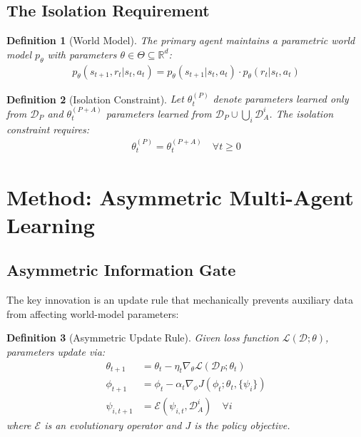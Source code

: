 \documentclass[12pt, a4paper]{article}
\newtheorem{definition}{Definition}
\begin{document}
\subsection{The Isolation Requirement}

\begin{definition}[World Model]
The primary agent maintains a parametric world model $p_\theta$ with parameters $\theta \in \Theta \subseteq \mathbb{R}^d$:
\begin{align}
p_\theta(s_{t+1}, r_t | s_t, a_t) = p_\theta(s_{t+1} | s_t, a_t) \cdot p_\theta(r_t | s_t, a_t)
\end{align}
\end{definition}

\begin{definition}[Isolation Constraint]
Let $\theta_t^{(P)}$ denote parameters learned only from $\mathcal{D}_P$ and $\theta_t^{(P+A)}$ parameters learned from $\mathcal{D}_P \cup \bigcup_i \mathcal{D}_A^i$. The isolation constraint requires:
\begin{align}
\theta_t^{(P)} = \theta_t^{(P+A)} \quad \forall t \geq 0
\end{align}
\end{definition}

\section{Method: Asymmetric Multi-Agent Learning}

\subsection{Asymmetric Information Gate}

The key innovation is an update rule that mechanically prevents auxiliary data from affecting world-model parameters:

\begin{definition}[Asymmetric Update Rule]
Given loss function $\mathcal{L}(\mathcal{D}; \theta)$, parameters update via:
\begin{align}
\theta_{t+1} &= \theta_t - \eta_t \nabla_\theta \mathcal{L}(\mathcal{D}_P; \theta_t) \label{eq:world_update}\\
\phi_{t+1} &= \phi_t - \alpha_t \nabla_\phi J(\phi_t; \theta_t, \{\psi_i\}) \label{eq:policy_update}\\
\psi_{i,t+1} &= \mathcal{E}(\psi_{i,t}, \mathcal{D}_A^i) \quad \forall i \label{eq:aux_update}
\end{align}
where $\mathcal{E}$ is an evolutionary operator and $J$ is the policy objective.
\end{definition}
\end{document}
